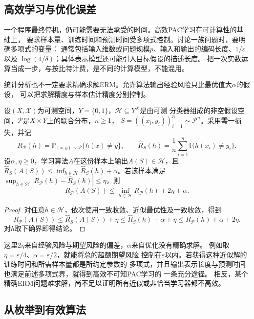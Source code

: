 \subsection{高效学习与优化误差}

一个程序最终停机，仍可能需要无法承受的时间。高效PAC学习在可计算性的基础上，
要求样本量、训练时间和预测时间受多项式控制。讨论一族问题时，要明确多项式的变量：
通常包括输入维数或问题规模$p$、输入和输出的编码长度、$1/\varepsilon$以及
$\log(1/\delta)$；具体表示模型还可能引入目标假设的描述长度。
把一次实数运算当成一步，与按比特计费，是不同的计算模型，不能混用。

统计分析也不一定要求精确求解ERM。允许算法输出经验风险只比最优值大$\alpha$的假设，
可以把求解精度与样本估计精度分别控制。

\begin{theorem}[近似ERM的期望风险保证]
\label{thm:approximate-erm-risk}
设$(X,\mathcal X)$为可测空间，$Y=\{0,1\}$，$\mathcal H\subseteq Y^X$是由可测
分类器组成的非空假设空间，$\mathcal P$是$X\times Y$上的联合分布，$n\geq1$，
$S=((x_i,y_i))_{i=1}^n\sim\mathcal P^n$。采用零一损失，并记
\[
 R_{\mathcal P}(h)=\mathbb P_{(x,y)\sim\mathcal P}\{h(x)\neq y\},\qquad
 \hat R_S(h)=\frac1n\sum_{i=1}^n\mathbb I\{h(x_i)\neq y_i\}.
\]
设$\alpha,\eta\geq0$，学习算法$A$在这份样本上输出$A(S)\in\mathcal H$，且
$\hat R_S(A(S))\leq\inf_{h\in\mathcal H}\hat R_S(h)+\alpha$。若该样本满足
$\sup_{h\in\mathcal H}|R_{\mathcal P}(h)-\hat R_S(h)|\leq\eta$，则
\[
 R_{\mathcal P}(A(S))
 \leq\inf_{h\in\mathcal H}R_{\mathcal P}(h)+2\eta+\alpha.
\]
\end{theorem}

\begin{proof}
对任意$h\in\mathcal H$，依次使用一致收敛、近似最优性及一致收敛，得到
\[
 R_{\mathcal P}(A(S))
 \leq\hat R_S(A(S))+\eta
 \leq\hat R_S(h)+\alpha+\eta
 \leq R_{\mathcal P}(h)+\alpha+2\eta.
\]
对$h$取下确界即得结论。
\end{proof}

这里$2\eta$来自经验风险与期望风险的偏差，$\alpha$来自优化没有精确求解。
例如取$\eta=\varepsilon/4$、$\alpha=\varepsilon/2$，就能将总的超额期望风险
控制在$\varepsilon$以内。若获得这种近似解的训练时间和所需样本量都是所约定参数的
多项式，并且输出表示长度与预测时间也满足前述多项式界，就得到高效不可知PAC学习的
一条充分途径。
相反，某个精确ERM问题难求解，尚不足以证明所有近似或非恰当学习器都不高效。

\subsection{从枚举到有效算法}

